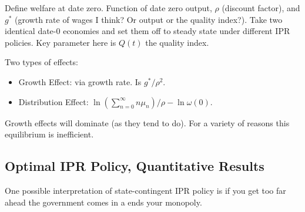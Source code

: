 \documentclass[11pt]{article}
\begin{document}
    Define welfare at date zero.  Function of date zero output, $\rho$ (discount factor), and $g^*$ (growth rate of wages I think? Or output or the quality index?). Take two identical date-0 economies and set them off to steady state under different IPR policies.  Key parameter here is $Q(t)$ the quality index.

    Two types of effects:
    \begin{itemize}
      \item Growth Effect: via growth rate.  Is $g^*/\rho^2$.
      \item Distribution Effect: $\ln(\sum_{n=0}^{\infty} n\mu_n)/\rho - \ln\omega(0)$.
    \end{itemize}

    Growth effects will dominate (as they tend to do).  For a variety of reasons this equilibrium is inefficient.

\subsection{Optimal IPR Policy, Quantitative Results}
\label{sub:optimal_ipr_policy_quantitative_results}

  One possible interpretation of state-contingent IPR policy is if you get too far ahead the government comes in a ends your monopoly.
\end{document}
